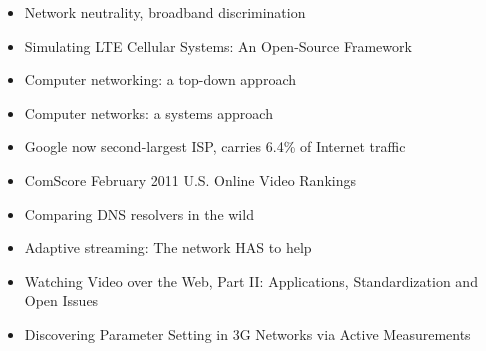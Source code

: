 \begin{itemize}
\item Network neutrality, broadband discrimination \cite{wu2003network}
\item Simulating LTE Cellular Systems: An Open-Source Framework \cite{5634134}
\item Computer networking: a top-down approach \cite{kurose2008computer}
\item Computer networks: a systems approach \cite{peterson2007computer}
\item Google now second-largest ISP, carries 6.4\% of Internet traffic \cite{nw2010carrier}
\item ComScore February 2011 U.S. Online Video Rankings \cite{comscore2011ranking}
\item Comparing DNS resolvers in the wild \cite{ager2010comparing}
\item Adaptive streaming: The network HAS to help \cite{BLTJ:BLTJ20505}
\item Watching Video over the Web, Part II: Applications, Standardization and Open Issues \cite{watching-video2}
\item Discovering Parameter Setting in 3G Networks via Active Measurements \cite{4640935}
\end{itemize}


